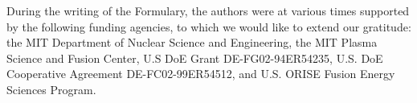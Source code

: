 \noindent
During the writing of the Formulary, the authors were at various times
supported by the following funding agencies, to which we would like to
extend our gratitude: the MIT Department of Nuclear Science and
Engineering, the MIT Plasma Science and Fusion Center, U.S DoE Grant
DE-FG02-94ER54235, U.S. DoE Cooperative Agreement DE-FC02-99ER54512,
and U.S. ORISE Fusion Energy Sciences Program.
